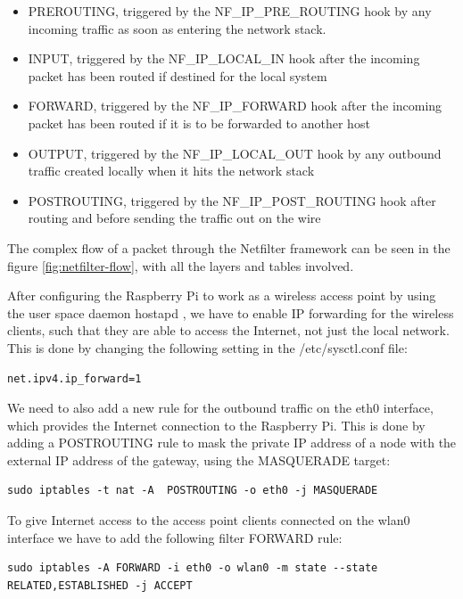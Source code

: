 \begin{itemize}
\item PREROUTING, triggered by the NF\_IP\_PRE\_ROUTING hook by any incoming traffic as soon as entering the network stack.
\item INPUT, triggered by the NF\_IP\_LOCAL\_IN hook after the incoming packet has been routed if destined for the local system
\item FORWARD, triggered by the NF\_IP\_FORWARD hook after the incoming packet has been routed if it is to be forwarded to another host
\item OUTPUT, triggered by the NF\_IP\_LOCAL\_OUT hook by any outbound traffic created locally when it hits the network stack
\item POSTROUTING, triggered by the NF\_IP\_POST\_ROUTING hook after routing and before sending the traffic out on the wire
\end{itemize}

The complex flow of a packet through the Netfilter framework can be seen in the figure \ref{fig:netfilter-flow}, with all the layers and tables involved.

After configuring the Raspberry Pi to work as a wireless access point \citep{raspberryPiAccessPoint} by using the user space daemon hostapd \citep{hostapd}, we have to enable IP forwarding for the wireless clients, such that they are able to access the Internet, not just the local network.  This is done by changing the following setting in the /etc/sysctl.conf file:

\begin{lstlisting}
net.ipv4.ip_forward=1
\end{lstlisting}

We need to also add a new rule for the outbound traffic on the eth0 interface, which provides the Internet connection to the Raspberry Pi. This is done by adding a POSTROUTING rule to mask the private IP address of a node with the external IP address of the gateway, using the MASQUERADE target: 

\begin{lstlisting}
sudo iptables -t nat -A  POSTROUTING -o eth0 -j MASQUERADE
\end{lstlisting}

To give Internet access to the access point clients connected on the wlan0 interface we have to add the following filter FORWARD rule:

\begin{lstlisting}
sudo iptables -A FORWARD -i eth0 -o wlan0 -m state --state RELATED,ESTABLISHED -j ACCEPT
\end{lstlisting}

